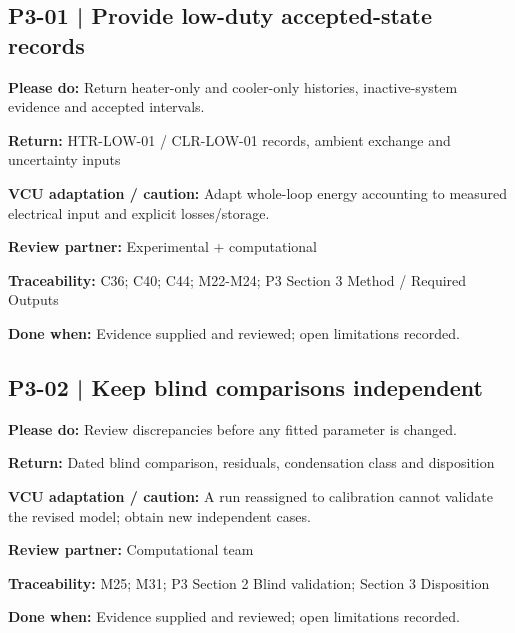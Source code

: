 \documentclass[11pt]{article}
\begin{document}
\par\noindent\begin{minipage}{\textwidth}\small\setlength{\parskip}{2pt}
\subsection*{P3-01 | Provide low-duty accepted-state records}
\textbf{Please do:} Return heater-only and cooler-only histories, inactive-system evidence and accepted intervals.\par
\textbf{Return:} HTR-LOW-01 / CLR-LOW-01 records, ambient exchange and uncertainty inputs\par
\textbf{VCU adaptation / caution:} Adapt whole-loop energy accounting to measured electrical input and explicit losses/storage.\par
\textbf{Review partner:} Experimental + computational\par
\textbf{Traceability:} C36; C40; C44; M22-M24; P3 Section 3 Method / Required Outputs\par
\textbf{Done when:} Evidence supplied and reviewed; open limitations recorded.\par
\end{minipage}\par\vspace{8pt}
\par\noindent\begin{minipage}{\textwidth}\small\setlength{\parskip}{2pt}
\subsection*{P3-02 | Keep blind comparisons independent}
\textbf{Please do:} Review discrepancies before any fitted parameter is changed.\par
\textbf{Return:} Dated blind comparison, residuals, condensation class and disposition\par
\textbf{VCU adaptation / caution:} A run reassigned to calibration cannot validate the revised model; obtain new independent cases.\par
\textbf{Review partner:} Computational team\par
\textbf{Traceability:} M25; M31; P3 Section 2 Blind validation; Section 3 Disposition\par
\textbf{Done when:} Evidence supplied and reviewed; open limitations recorded.\par
\end{minipage}\par\vspace{8pt}
\end{document}
